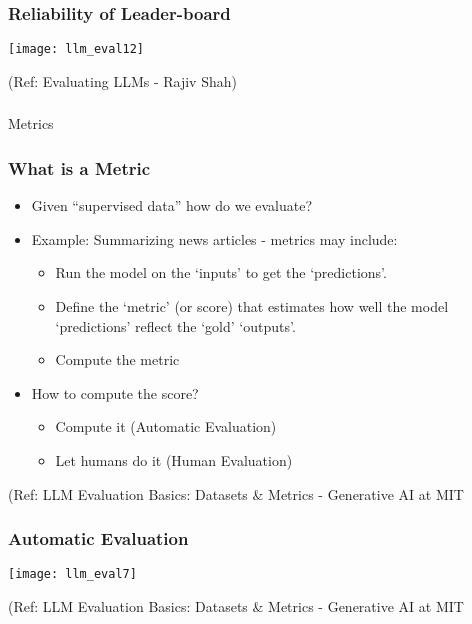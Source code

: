 \begin{frame}[fragile]\frametitle{Reliability of Leader-board}


\begin{center}
\texttt{[image: llm\_eval12]}
\end{center}		
		
  
  {\tiny (Ref: Evaluating LLMs - Rajiv Shah)}
  
\end{frame}

\begin{frame}[fragile]\frametitle{}
\begin{center}
{\Large Metrics}
\end{center}
\end{frame}

\begin{frame}[fragile]\frametitle{What is a Metric}

  \begin{itemize}
    \item Given ``supervised data'' how do we evaluate?
    \item Example: Summarizing news articles - metrics may include:
      \begin{itemize}
        \item Run the model on the `inputs' to get the `predictions'.
		\item Define the `metric' (or score) that estimates how well the model `predictions' reflect the `gold' `outputs'.
		\item Compute the metric
      \end{itemize}
    \item How to compute the score?
      \begin{itemize}
		\item Compute it (Automatic Evaluation)
        \item Let humans do it (Human Evaluation)
      \end{itemize}
  \end{itemize}
		
{\tiny (Ref: LLM Evaluation Basics: Datasets \& Metrics - Generative AI at MIT}
			
			
\end{frame}


\begin{frame}[fragile]\frametitle{Automatic Evaluation}


\begin{center}
\texttt{[image: llm\_eval7]}
\end{center}		
		
{\tiny (Ref: LLM Evaluation Basics: Datasets \& Metrics - Generative AI at MIT}
			
			
\end{frame}

